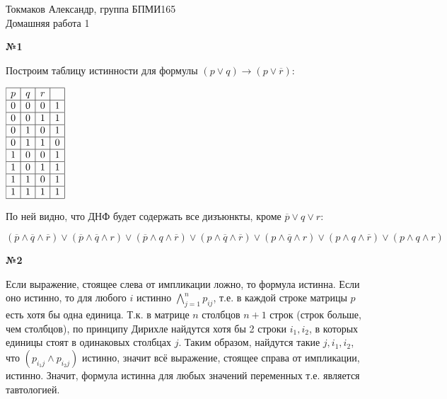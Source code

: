 \documentclass{article}
\newenvironment{task}{\begin{center}\fontsize{14}{14}\selectfont\bf}{\rm\fontsize{12}{12}\selectfont\end{center}}
\begin{document}
	\begin{center}
		Токмаков Александр, группа БПМИ165 \\
		Домашняя работа 1
	\end{center}

	
	\begin{task} 
		№1
	\end{task}

	Построим таблицу истинности для формулы $(p \vee q) \rightarrow (p \vee \overline{r})$:
	\begin{center}
			$\begin{array}{|c|c|c|c|}
		\hline 
		p			& q 				& r 				&  			\\ \hline
		0			& 0 				& 0 				& 1 		\\ \hline
		0			& 0 				& 1 				& 1 		\\ \hline
		0			& 1 				& 0 				& 1 		\\ \hline
		0			& 1 				& 1 				& 0 		\\ \hline
		1			& 0 				& 0 				& 1 		\\ \hline
		1			& 0 				& 1 				& 1 		\\ \hline
		1			& 1 				& 0 				& 1 		\\ \hline
		1			& 1 				& 1 				& 1 		\\ \hline
		
		\end{array}$
	\end{center}
	
	По ней видно, что ДНФ будет содержать все дизъюнкты, кроме $\overline{p} \vee q \vee r$: 

	\begin{center}
		$ (\overline{p} \wedge \overline{q} \wedge \overline{r}) \vee (\overline{p} \wedge \overline{q} \wedge r) \vee (\overline{p} \wedge q \wedge \overline{r}) \vee 
		  (p \wedge \overline{q} \wedge \overline{r}) \vee (p \wedge \overline{q} \wedge r) \vee (p \wedge q \wedge \overline{r}) \vee (p \wedge q \wedge r)$
	\end{center}
	\fontsize{12}{12}
	

		
	\begin{task} 
		№2
	\end{task}

	Если выражение, стоящее слева от импликации ложно, то формула истинна. Если оно истинно, то для любого $i$ истинно $\bigwedge_{j=1}^{n} p_{ij}$, т.е. в каждой строке матрицы $p$ есть хотя бы одна единица. Т.к. в матрице $n$ столбцов $n+1$ строк (строк больше, чем столбцов), по принципу Дирихле найдутся хотя бы 2 строки $i_1, i_2$, в которых единицы стоят в одинаковых столбцах $j$. Таким образом, найдутся такие $j, i_1, i_2$, что $(p_{i_{1}j} \wedge p_{i_{2}j})$ истинно, значит всё выражение, стоящее справа от импликации, истинно. Значит, формула истинна для любых значений переменных т.е. является тавтологией.
	

	
\end{document}
